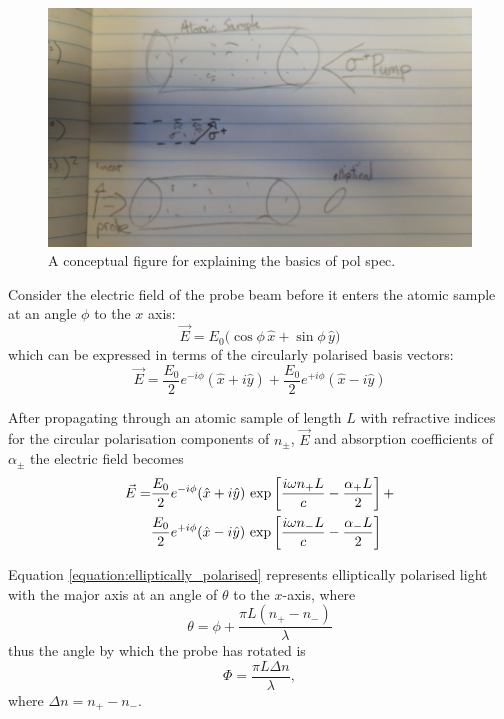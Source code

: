 \begin{figure}
\centering
\includegraphics[width=\linewidth,angle=180]{part1/Figs/pol_spec_explanation_placeholder.jpg}
\caption{A conceptual figure for explaining the basics of pol spec.}
\label{figure:pol_spec_explanation}
\end{figure}

Consider the electric field of the probe beam before it enters the atomic sample at an angle $\phi$ to the $x$ axis:
\begin{equation}
\vec{E}=E_0\big(\cos{\phi}\,\hat{x}+\sin{\phi}\,\hat{y}\big)
\end{equation}
which can be expressed in terms of the circularly polarised basis vectors:
\begin{equation}
\vec{E} = \frac{E_0}{2}e^{-i\phi}(\hat{x}+i\hat{y}) + \frac{E_0}{2}e^{+i\phi}(\hat{x}-i\hat{y})
\end{equation}

After propagating through an atomic sample of length $L$ with refractive indices for the circular polarisation components of $n_\pm$, $\vec{E}$ and absorption coefficients of $\alpha_\pm$ the electric field becomes
\begin{align}
\vec{E} = &\frac{E_0}{2}e^{-i\phi}(\hat{x}+i\hat{y})\,\exp\left[\frac{i\omega n_+ L}{c} - \frac{\alpha_+ L}{2}\right] +\notag\\
&\frac{E_0}{2}e^{+i\phi}(\hat{x}-i\hat{y})\,\exp\left[\frac{i\omega n_- L}{c} - \frac{\alpha_- L}{2}\right]\label{equation:elliptically_polarised}
\end{align}

Equation \ref{equation:elliptically_polarised} represents elliptically polarised light with the major axis at an angle of $\theta$ to the $x$-axis, where
\begin{equation}
\theta = \phi + \frac{\pi L (n_+ - n_-)}{\lambda}
\end{equation}
thus the angle by which the probe has rotated is
\begin{equation}
\Phi = \frac{\pi L \Delta n}{\lambda},
\end{equation}
where $\Delta n = n_+ - n_-$.

